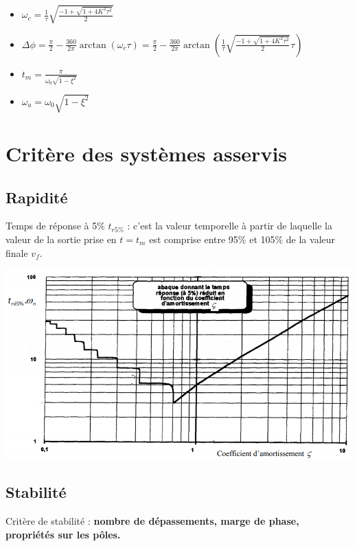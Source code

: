 \begin{center}
\begin{itemize}
    \item
    \Large{$
    \omega_{c} = 
    \frac{1}{\tau}
    \sqrt{\frac{
    -1 + \sqrt{1+4K^{2}\tau^{2}}
    }
    {2}
    }
    $} 

    \item \Large{$
\Delta \phi =  
\frac{\pi}{2}- \frac{360}{2\pi}\arctan{(\omega_{c}\tau) =
\frac{\pi}{2}- \frac{360}{2\pi}\arctan{(\frac{1}{\tau}
    \sqrt{\frac{
    -1 + \sqrt{1+4K^{2}\tau^{2}}
    }
    {2}
    }\tau)}}
$}

    \item \Large{$t_{m}=\frac{\pi}{\omega_{0}\sqrt{1-\xi^{2}}}$}

    \item \Large{$\omega_{a}=\omega_{0}\sqrt{1-\xi^{2}}$}
    \end{itemize}
\end{center}

\newpage
\section{Critère des systèmes asservis}
\subsection{Rapidité}
Temps de réponse à 5\% $t_{r5\%}$ : c'est la valeur temporelle à partir de laquelle la valeur de la sortie prise en $t=t_m$ est comprise entre 95\% et 105\% de la valeur finale $v_f$.
\begin{center}
    \includegraphics[scale=0.7]{Pics/rapidite_abaque.png}
\end{center}
\newpage
\subsection{Stabilité}
Critère de stabilité : \textbf{nombre de dépassements, marge de phase, propriétés sur les pôles.} \newline

